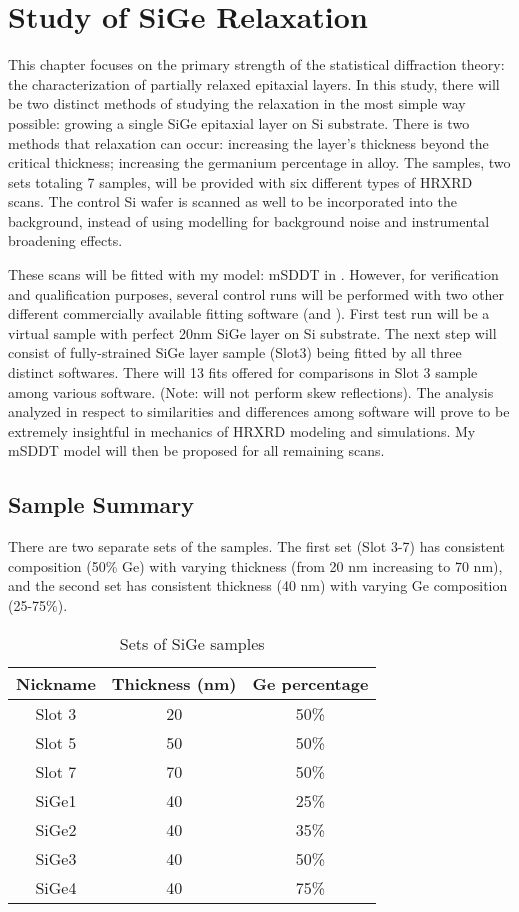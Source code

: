 \chapter{Study of SiGe Relaxation}

This chapter focuses on the primary strength of the statistical diffraction theory:  the characterization of partially relaxed epitaxial layers.  In this study, there will be two distinct methods of studying the relaxation in the most simple way possible: growing a single SiGe epitaxial layer on Si substrate.  There is two methods that relaxation can occur:   increasing the layer's thickness beyond the critical thickness;  increasing the germanium percentage in alloy.  The samples, two sets totaling 7 samples, will be provided with six different types of HRXRD scans.   The control Si wafer is scanned as well to be incorporated into the background, instead of using modelling for background noise and instrumental broadening effects.

These scans will be fitted with my model:  mSDDT in \MathLogo.  However, for verification and qualification purposes, several control runs will be performed with two other different commercially available fitting software (\LEPTOS and \RADS).  First test run will be a virtual sample with perfect 20nm SiGe layer on Si substrate.  The next step will consist of  fully-strained SiGe layer sample (Slot3)  being fitted by all three distinct softwares.  There will 13 fits offered for comparisons in Slot 3 sample among various software. (Note:  \RADS will not perform skew reflections).  The analysis analyzed in respect to similarities and differences among software will prove to be extremely insightful in mechanics of HRXRD modeling and simulations.  My mSDDT model will then be proposed for all remaining scans.


\section{Sample Summary}

There are two separate sets of the samples.  The first set (Slot 3-7) has consistent composition (50\% Ge) with varying thickness (from 20 nm increasing to 70 nm), and the second set has consistent thickness (40 nm) with varying Ge composition (25-75\%).

\begin{table}[h]
\caption{Sets of SiGe samples}
\label{TableSiGe-set}
\centering
\begin{tabular}{c|cc}
Nickname & Thickness (nm)  & Ge percentage\\
\hline
Slot 3 	& 20	& 50\% \\
Slot 5 	& 50	&50\%\\
Slot 7	& 70	&50\%\\
\hline
SiGe1	& 40	&  25\% \\
SiGe2	& 40 	& 35\%\\
SiGe3	& 40	& 50\%\\
SiGe4	& 40 	& 75\%\\
\end{tabular}
\end{table}


